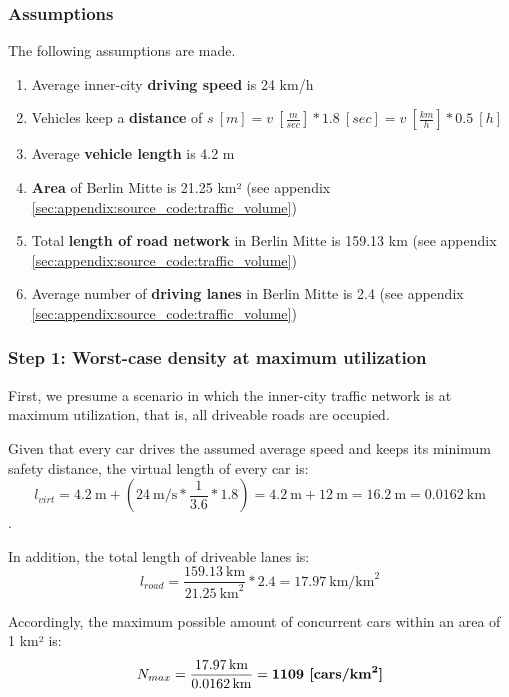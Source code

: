 \subsubsection{Assumptions}
The following assumptions are made.

\begin{samepage}
\begin{enumerate}
	\item Average inner-city \textbf{driving speed} is 24 km/h \cite{Forbes2008}
	\item Vehicles keep a \textbf{distance} of $s \ [m] = v \ [\frac{m}{sec}] * 1.8 \ [sec] = v \  [\frac{km}{h}] * 0.5 \ [h]$ \cite{wiki:sicherheitsabstand}
	\item Average \textbf{vehicle length} is 4.2 m
	\item \textbf{Area} of Berlin Mitte is 21.25 km² (see appendix \autoref{sec:appendix:source_code:traffic_volume})
	\item Total \textbf{length of road network} in Berlin Mitte is 159.13 km (see appendix \autoref{sec:appendix:source_code:traffic_volume})
	\item Average number of \textbf{driving lanes} in Berlin Mitte is 2.4 (see appendix \autoref{sec:appendix:source_code:traffic_volume})
\end{enumerate}
\end{samepage}

\subsubsection{Step 1: Worst-case density at maximum utilization}
First, we presume a scenario in which the inner-city traffic network is at maximum utilization, that is, all driveable roads are occupied.

Given that every car drives the assumed average speed and keeps its minimum safety distance, the virtual length of every car is: $$l_{virt} = \SI{4.2}{\meter} + (\SI{24}{\meter\per\second} * \frac{1}{3.6} * 1.8) = \SI{4.2}{\meter} + \SI{12}{\meter} = \SI{16.2}{\meter} = \SI{0.0162}{\km}$$.

In addition, the total length of driveable lanes is:
$$l_{road} = \frac{\SI{159.13}{\km}}{\SI{21.25}{\square\km}} * 2.4 = \SI{17.97}{\km\per\square\km}$$

Accordingly, the maximum possible amount of concurrent cars within an area of 1 km² is:
$$N_{max} = \frac{\SI{17.97}{\km}}{\SI{0.0162}{\km}} = \textbf{1109 [\si[detect-weight]{cars\per\square\km}]}$$

